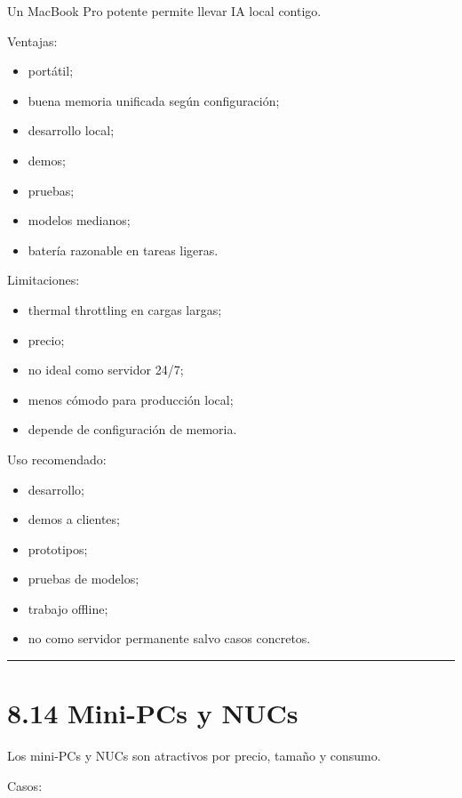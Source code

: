 Un MacBook Pro potente permite llevar IA local contigo.

Ventajas:

\begin{itemize}
\tightlist
\item
  portátil;
\item
  buena memoria unificada según configuración;
\item
  desarrollo local;
\item
  demos;
\item
  pruebas;
\item
  modelos medianos;
\item
  batería razonable en tareas ligeras.
\end{itemize}

Limitaciones:

\begin{itemize}
\tightlist
\item
  thermal throttling en cargas largas;
\item
  precio;
\item
  no ideal como servidor 24/7;
\item
  menos cómodo para producción local;
\item
  depende de configuración de memoria.
\end{itemize}

Uso recomendado:

\begin{itemize}
\tightlist
\item
  desarrollo;
\item
  demos a clientes;
\item
  prototipos;
\item
  pruebas de modelos;
\item
  trabajo offline;
\item
  no como servidor permanente salvo casos concretos.
\end{itemize}

\begin{center}\rule{0.5\linewidth}{0.5pt}\end{center}

\section{8.14 Mini-PCs y NUCs}\label{mini-pcs-y-nucs}

Los mini-PCs y NUCs son atractivos por precio, tamaño y consumo.

Casos:

